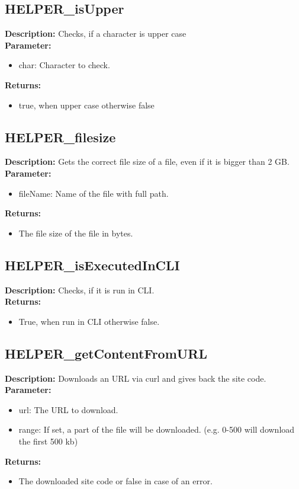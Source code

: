 \subsection{HELPER\_isUpper}
\textbf{Description:} Checks, if a character is upper case\\
\textbf{Parameter:}
\begin{itemize}
\item char: Character to check.
\end{itemize}
\textbf{Returns:}
\begin{itemize}
\item true, when upper case otherwise false
\end{itemize}

\subsection{HELPER\_filesize}
\textbf{Description:} Gets the correct file size of a file, even if it is bigger than 2 GB.\\
\textbf{Parameter:}
\begin{itemize}
\item fileName: Name of the file with full path.
\end{itemize}
\textbf{Returns:}
\begin{itemize}
\item The file size of the file in bytes.
\end{itemize}

\subsection{HELPER\_isExecutedInCLI}
\textbf{Description:} Checks, if it is run in CLI.\\
\textbf{Returns:}
\begin{itemize}
\item True, when run in CLI otherwise false.
\end{itemize}

\subsection{HELPER\_getContentFromURL}
\textbf{Description:} Downloads an URL via curl and gives back the site code.\\
\textbf{Parameter:}
\begin{itemize}
\item url: The URL to download.
\item range: If set, a part of the file will be downloaded. (e.g. 0-500 will download the first 500 kb)
\end{itemize}
\textbf{Returns:}
\begin{itemize}
\item The downloaded site code or false in case of an error.
\end{itemize}

